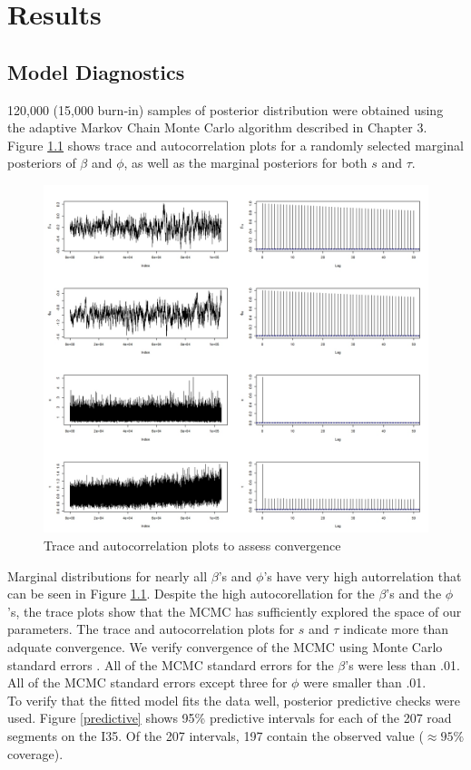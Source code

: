 \chapter{Results}

\section{Model Diagnostics}
120,000 (15,000 burn-in) samples of posterior distribution were obtained using the adaptive Markov Chain Monte Carlo algorithm described in Chapter 3. Figure \ref{diagnostics} shows trace and autocorrelation plots for a randomly selected marginal posteriors of $\beta$ and $\phi$, as well as the marginal posteriors for both $s$ and $\tau$. 

\begin{figure}
\centering
\includegraphics[width=.70\textwidth]{diagnostics.jpeg}
\caption{Trace and autocorrelation plots to assess convergence}
\label{diagnostics}
\end{figure}

Marginal distributions for nearly all $\beta$'s and $\phi$'s have very high autorrelation that can be seen in Figure \ref{diagnostics}. Despite the high autocorellation for the $\beta$'s and the $\phi$'s, the trace plots show that the MCMC has sufficiently explored the space of our parameters. The trace and autocorrelation plots for $s$ and $\tau$ indicate more than adquate convergence. We verify convergence of the MCMC using Monte Carlo standard errors \citep{jones06}. All of the MCMC standard errors for the $\beta$'s were less than .01. All of the MCMC standard errors except three for $\phi$ were smaller than .01. \\

To verify that the fitted model fits the data well, posterior predictive checks were used. Figure \ref{predictive} shows 95\% predictive intervals for each of the 207 road segments on the I35. Of the 207 intervals, 197 contain the observed value ($\approx 95\%$ coverage).


